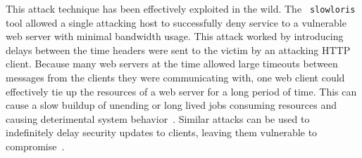 This attack technique has been effectively exploited in the wild.  The {\tt 
slowloris} tool
allowed a single attacking host to successfully deny service to a vulnerable
web server with minimal bandwidth usage.  This attack worked by introducing
delays between the time headers were sent to the victim by an attacking HTTP
client.  Because many web servers at the time allowed large timeouts between
messages from the clients they were communicating with, one web client could
effectively tie up the resources of a web server for a long period of
time.
This can cause a slow buildup of unending or long
lived jobs consuming resources and causing deterimental system 
behavior~\cite{Slowloris}.  Similar attacks can be used to indefinitely 
delay security updates to clients, leaving them vulnerable to 
compromise~\cite{Cappos_TR_08}.



